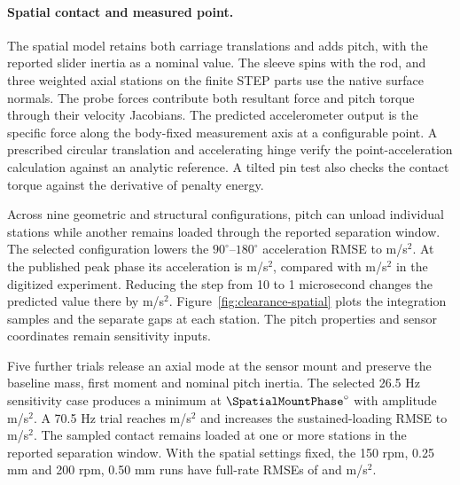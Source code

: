 \ifdefined\SpatialQuiet
\paragraph{Spatial contact and measured point.}
The spatial model retains both carriage translations and adds pitch,
with the reported slider inertia as a nominal value. The sleeve spins
with the rod, and three weighted axial stations on the finite STEP parts
use the native surface normals. The probe forces contribute both
resultant force and pitch torque through their velocity Jacobians.
The predicted accelerometer output is the specific force along the
body-fixed measurement axis at a configurable point. A prescribed
circular translation and accelerating hinge verify the point-acceleration
calculation against an analytic reference. A tilted pin test also
checks the contact torque against the derivative of penalty energy.

Across nine geometric and structural configurations, pitch can unload
individual stations while another remains loaded through the reported
separation window. The selected configuration lowers the
\(90^\circ\)--\(180^\circ\) acceleration RMSE to \SpatialQuiet{} m/s\(^{2}\).
At the published peak phase its acceleration is \SpatialPredicted{}
m/s\(^{2}\), compared with \SpatialMeasured{} m/s\(^{2}\) in the
digitized experiment. Reducing the step from 10 to 1 microsecond changes
the predicted value there by \SpatialOneMicrosecondDelta{} m/s\(^{2}\).
Figure~\ref{fig:clearance-spatial} plots the integration samples and
the separate gaps at each station. The pitch properties and sensor
coordinates remain sensitivity inputs.

Five further trials release an axial mode at the sensor mount and
preserve the baseline mass, first moment and nominal pitch inertia.
The selected 26.5 Hz sensitivity case produces a minimum at
\(\SpatialMountPhase^\circ\) with amplitude \SpatialMountPeak{}
m/s\(^{2}\). A 70.5 Hz trial reaches \SpatialLargeMountPeak{} m/s\(^{2}\)
and increases the sustained-loading RMSE to \SpatialLargeMountQuiet{}
m/s\(^{2}\). The sampled contact remains loaded at one or more stations
in the reported separation window. With the spatial settings fixed,
the 150 rpm, 0.25 mm and 200 rpm, 0.50 mm runs have full-rate RMSEs
of \SpatialTransferLow{} and \SpatialTransferBig{} m/s\(^{2}\).

